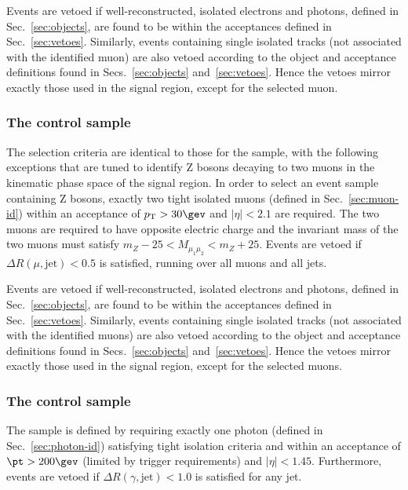 Events are vetoed if well-reconstructed, isolated electrons and
photons, defined in Sec.~\ref{sec:objects}, are found to be within the
acceptances defined in Sec.~\ref{sec:vetoes}. Similarly, events
containing single isolated tracks (not associated with the identified
muon) are also vetoed according to the object and acceptance
definitions found in Secs.~\ref{sec:objects}
and~\ref{sec:vetoes}. Hence the vetoes mirror exactly those used in
the signal region, except for the selected muon.

\subsubsection{The \texorpdfstring{\mmj}{di-muon plus jets} control sample}
\label{sec:mumucontrolSelection}

The selection criteria are identical to those for the \mj sample, with
the following exceptions that are tuned to identify Z bosons decaying
to two muons in the kinematic phase space of the signal region.  In
order to select an event sample containing Z bosons, exactly two tight
isolated muons (defined in Sec.~\ref{sec:muon-id}) within an
acceptance of $\Pt > 30\gev$ and $|\eta| < 2.1$ are required. The two
muons are required to have opposite electric charge and the invariant
mass of the two muons must satisfy $m_{Z} - 25 < M_{\mu_1\mu_2} <
m_{Z} +25$.  Events are vetoed if $\Delta R(\mu,\textrm{jet}) < 0.5$
is satisfied, running over all muons and all jets.

Events are vetoed if well-reconstructed, isolated electrons and
photons, defined in Sec.~\ref{sec:objects}, are found to be within the
acceptances defined in Sec.~\ref{sec:vetoes}. Similarly, events
containing single isolated tracks (not associated with the identified
muons) are also vetoed according to the object and acceptance
definitions found in Secs.~\ref{sec:objects}
and~\ref{sec:vetoes}. Hence the vetoes mirror exactly those used in
the signal region, except for the selected muons.

\subsubsection{The \texorpdfstring{\gj}{photon plus jets} control sample}
\label{sec:photoncontrolSelection}

The \gj sample is defined by requiring exactly one photon (defined in
Sec.~\ref{sec:photon-id}) satisfying tight isolation criteria and
within an acceptance of $\pt > 200\gev$ (limited by trigger
requirements) and $|\eta| < 1.45$. Furthermore, events are vetoed if
$\Delta R(\gamma,\textrm{jet}) < 1.0$ is satisfied for any jet.

